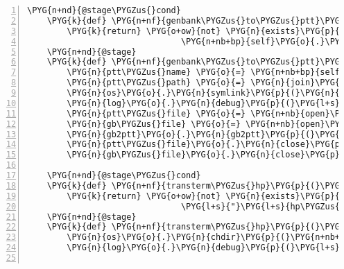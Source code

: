 \begin{Verbatim}[commandchars=\\\{\},numbers=left,firstnumber=1,stepnumber=5]
    \PYG{n+nd}{@stage\PYGZus{}cond}
    \PYG{k}{def} \PYG{n+nf}{genbank\PYGZus{}to\PYGZus{}ptt}\PYG{p}{(}\PYG{n+nb+bp}{self}\PYG{p}{)}\PYG{p}{:}
        \PYG{k}{return} \PYG{o+ow}{not} \PYG{n}{exists}\PYG{p}{(}\PYG{n}{join}\PYG{p}{(}\PYG{n+nb+bp}{self}\PYG{o}{.}\PYG{n}{analysis}\PYG{o}{.}\PYG{n}{genbank\PYGZus{}data\PYGZus{}dir}\PYG{p}{,}
                               \PYG{n+nb+bp}{self}\PYG{o}{.}\PYG{n}{genbank\PYGZus{}record}\PYG{o}{.}\PYG{n}{id} \PYG{o}{+} \PYG{l+s}{"}\PYG{l+s}{.ptt}\PYG{l+s}{"}\PYG{p}{)}\PYG{p}{)}
    \PYG{n+nd}{@stage}
    \PYG{k}{def} \PYG{n+nf}{genbank\PYGZus{}to\PYGZus{}ptt}\PYG{p}{(}\PYG{n+nb+bp}{self}\PYG{p}{)}\PYG{p}{:}
        \PYG{n}{ptt\PYGZus{}name} \PYG{o}{=} \PYG{n+nb+bp}{self}\PYG{o}{.}\PYG{n}{genbank\PYGZus{}record}\PYG{o}{.}\PYG{n}{id} \PYG{o}{+} \PYG{l+s}{"}\PYG{l+s}{.ptt}\PYG{l+s}{"}
        \PYG{n}{ptt\PYGZus{}path} \PYG{o}{=} \PYG{n}{join}\PYG{p}{(}\PYG{n+nb+bp}{self}\PYG{o}{.}\PYG{n}{analysis}\PYG{o}{.}\PYG{n}{genbank\PYGZus{}data\PYGZus{}dir}\PYG{p}{,} \PYG{n}{ptt\PYGZus{}name}\PYG{p}{)}
        \PYG{n}{os}\PYG{o}{.}\PYG{n}{symlink}\PYG{p}{(}\PYG{n}{ptt\PYGZus{}name}\PYG{p}{,} \PYG{n}{join}\PYG{p}{(}\PYG{n+nb+bp}{self}\PYG{o}{.}\PYG{n}{analysis}\PYG{o}{.}\PYG{n}{genbank\PYGZus{}data\PYGZus{}dir}\PYG{p}{,} \PYG{l+s}{"}\PYG{l+s}{chr.ptt}\PYG{l+s}{"}\PYG{p}{)}\PYG{p}{)}
        \PYG{n}{log}\PYG{o}{.}\PYG{n}{debug}\PYG{p}{(}\PYG{l+s}{"}\PYG{l+s}{converting }\PYG{l+s+si}{\PYGZpc{}s}\PYG{l+s}{ to ptt}\PYG{l+s}{"} \PYG{o}{\PYGZpc{}} \PYG{n+nb+bp}{self}\PYG{o}{.}\PYG{n}{analysis}\PYG{o}{.}\PYG{n}{genbankfile\PYGZus{}name}\PYG{p}{)}
        \PYG{n}{ptt\PYGZus{}file} \PYG{o}{=} \PYG{n+nb}{open}\PYG{p}{(}\PYG{n}{ptt\PYGZus{}path}\PYG{p}{,} \PYG{l+s}{"}\PYG{l+s}{w}\PYG{l+s}{"}\PYG{p}{)}
        \PYG{n}{gb\PYGZus{}file} \PYG{o}{=} \PYG{n+nb}{open}\PYG{p}{(}\PYG{n+nb+bp}{self}\PYG{o}{.}\PYG{n}{analysis}\PYG{o}{.}\PYG{n}{genbankfile\PYGZus{}path}\PYG{p}{)}
        \PYG{n}{gb2ptt}\PYG{o}{.}\PYG{n}{gb2ptt}\PYG{p}{(}\PYG{n}{gb\PYGZus{}file}\PYG{p}{,} \PYG{n}{ptt\PYGZus{}file}\PYG{p}{)}
        \PYG{n}{ptt\PYGZus{}file}\PYG{o}{.}\PYG{n}{close}\PYG{p}{(}\PYG{p}{)}
        \PYG{n}{gb\PYGZus{}file}\PYG{o}{.}\PYG{n}{close}\PYG{p}{(}\PYG{p}{)}

    \PYG{n+nd}{@stage\PYGZus{}cond}
    \PYG{k}{def} \PYG{n+nf}{transterm\PYGZus{}hp}\PYG{p}{(}\PYG{n+nb+bp}{self}\PYG{p}{)}\PYG{p}{:}
        \PYG{k}{return} \PYG{o+ow}{not} \PYG{n}{exists}\PYG{p}{(}\PYG{n}{join}\PYG{p}{(}\PYG{n+nb+bp}{self}\PYG{o}{.}\PYG{n}{analysis}\PYG{o}{.}\PYG{n}{data\PYGZus{}dir}\PYG{p}{,}
                               \PYG{l+s}{"}\PYG{l+s}{hp\PYGZus{}terminators.bigbed}\PYG{l+s}{"}\PYG{p}{)}\PYG{p}{)}
    \PYG{n+nd}{@stage}
    \PYG{k}{def} \PYG{n+nf}{transterm\PYGZus{}hp}\PYG{p}{(}\PYG{n+nb+bp}{self}\PYG{p}{)}\PYG{p}{:}
        \PYG{n}{os}\PYG{o}{.}\PYG{n}{chdir}\PYG{p}{(}\PYG{n+nb+bp}{self}\PYG{o}{.}\PYG{n}{analysis}\PYG{o}{.}\PYG{n}{data\PYGZus{}dir}\PYG{p}{)}
        \PYG{n}{log}\PYG{o}{.}\PYG{n}{debug}\PYG{p}{(}\PYG{l+s}{"}\PYG{l+s}{running transterm}\PYG{l+s}{"}\PYG{p}{)}


\end{Verbatim}
